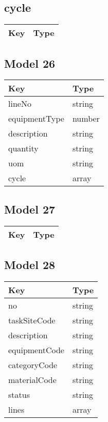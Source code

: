 \documentclass[10pt]{article}
\begin{document}
            \subsection{cycle}
            
            \begin{tabularx}{\textwidth}{lZ}
                \textbf{Key} & \textbf{Type} \\
                \hline
            \end{tabularx}
            \subsection{Model 26}
            
            \begin{tabularx}{\textwidth}{lZ}
                \textbf{Key} & \textbf{Type} \\
                \hline
                    lineNo & string \\
                    equipmentType & number \\
                    description & string \\
                    quantity & string \\
                    uom & string \\
                    cycle & array \\
            \end{tabularx}
            \subsection{Model 27}
            
            \begin{tabularx}{\textwidth}{lZ}
                \textbf{Key} & \textbf{Type} \\
                \hline
            \end{tabularx}
            \subsection{Model 28}
            
            \begin{tabularx}{\textwidth}{lZ}
                \textbf{Key} & \textbf{Type} \\
                \hline
                    no & string \\
                    taskSiteCode & string \\
                    description & string \\
                    equipmentCode & string \\
                    categoryCode & string \\
                    materialCode & string \\
                    status & string \\
                    lines & array \\
            \end{tabularx}
\end{document}
